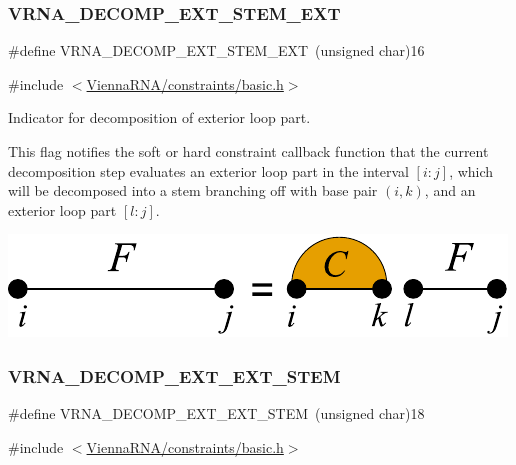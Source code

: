\subsubsection{\texorpdfstring{VRNA\_DECOMP\_EXT\_STEM\_EXT}{VRNA\_DECOMP\_EXT\_STEM\_EXT}}
{\footnotesize\ttfamily \#define V\+R\+N\+A\+\_\+\+D\+E\+C\+O\+M\+P\+\_\+\+E\+X\+T\+\_\+\+S\+T\+E\+M\+\_\+\+E\+XT~(unsigned char)16}



{\ttfamily \#include $<$\mbox{\hyperlink{constraints_2basic_8h}{Vienna\+R\+N\+A/constraints/basic.\+h}}$>$}



Indicator for decomposition of exterior loop part. 

This flag notifies the soft or hard constraint callback function that the current decomposition step evaluates an exterior loop part in the interval $[i:j]$, which will be decomposed into a stem branching off with base pair $(i,k)$, and an exterior loop part $[l:j]$.

 
\begin{DoxyImageNoCaption}
  \mbox{\includegraphics[width=\textwidth,height=\textheight/2,keepaspectratio=true]{decomp_ext_stem_ext}}
\end{DoxyImageNoCaption}
 \mbox{\label{group__constraints_ga06efd054c9271438f6d82d4559d9e69f}} 
\subsubsection{\texorpdfstring{VRNA\_DECOMP\_EXT\_EXT\_STEM}{VRNA\_DECOMP\_EXT\_EXT\_STEM}}
{\footnotesize\ttfamily \#define V\+R\+N\+A\+\_\+\+D\+E\+C\+O\+M\+P\+\_\+\+E\+X\+T\+\_\+\+E\+X\+T\+\_\+\+S\+T\+EM~(unsigned char)18}



{\ttfamily \#include $<$\mbox{\hyperlink{constraints_2basic_8h}{Vienna\+R\+N\+A/constraints/basic.\+h}}$>$}



